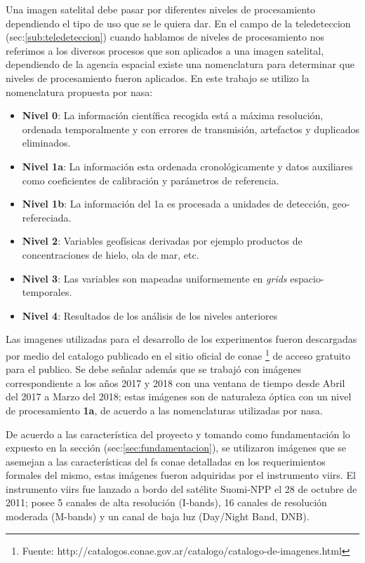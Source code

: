 Una imagen satelital debe pasar por diferentes niveles de procesamiento dependiendo el tipo de uso que se le quiera dar. En el campo de la teledeteccion (sec:\ref{sub:teledeteccion}) cuando hablamos de niveles de procesamiento nos referimos a los diversos procesos que son aplicados a una imagen satelital, dependiendo de la agencia espacial existe una nomenclatura para determinar que niveles de procesamiento fueron aplicados. En este trabajo se utilizo la nomenclatura propuesta por \ac{nasa}:
\begin{itemize}
	\item \textbf{Nivel 0}: La información científica recogida está a máxima resolución, ordenada temporalmente y con errores de transmisión, artefactos y duplicados eliminados.
 	\item \textbf{Nivel 1a}: La información esta ordenada cronológicamente y datos auxiliares como coeficientes de calibración y parámetros de referencia.
 	\item \textbf{Nivel 1b}: La información del 1a es procesada a unidades de detección, geo-refereciada.
 	\item \textbf{Nivel 2}: Variables geofísicas derivadas por ejemplo productos de concentraciones de hielo, ola de mar, etc.
 	\item \textbf{Nivel 3}: Las variables son mapeadas uniformemente en \textit{grids} espacio-temporales.
 	\item \textbf{Nivel 4}: Resultados de los análisis de los niveles anteriores
\end{itemize}

Las imagenes utilizadas para el desarrollo de los experimentos fueron descargadas por medio del catalogo  publicado en el sitio oficial de \ac{conae} \footnote{Fuente: http://catalogos.conae.gov.ar/catalogo/catalogo-de-imagenes.html} de acceso gratuito para el publico. Se debe señalar además que se trabajó con imágenes correspondiente a los años 2017 y 2018 con una ventana de tiempo desde Abril del 2017 a Marzo del 2018; estas imágenes son de naturaleza óptica con un nivel de procesamiento \textbf{1a}, de acuerdo a las nomenclaturas utilizadas por \ac{nasa}.

De acuerdo a las característica del proyecto y tomando como fundamentación lo expuesto en la sección (sec:\ref{sec:fundamentacion}), se utilizaron imágenes que se asemejan a las características del \ac{fs} \ac{conae} detalladas en los requerimientos formales del mismo, estas imágenes fueron adquiridas por el instrumento \ac{viirs}. El instrumento \ac{viirs} fue lanzado a bordo del satélite Suomi-NPP el 28 de octubre de 2011; posee 5 canales de alta resolución (I-bands), 16 canales de resolución moderada (M-bands) y un canal de baja luz (Day/Night Band, DNB).  

